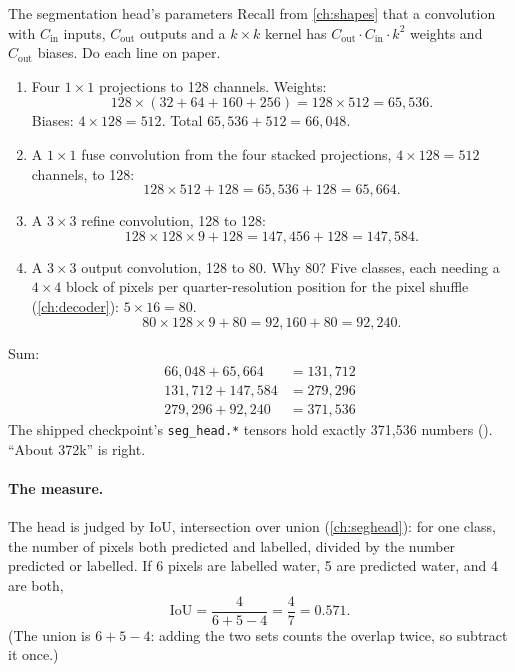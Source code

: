\begin{worked}[label={we:ftruns:seghead}]{The segmentation head's parameters}
Recall from \cref{ch:shapes} that a convolution with $C_\text{in}$ inputs, $C_\text{out}$ outputs and a $k
\times k$ kernel has $C_\text{out} \cdot C_\text{in} \cdot k^2$ weights and $C_\text{out}$ biases. Do each line
on paper.
\begin{enumerate}
\item Four $1 \times 1$ projections to 128 channels. Weights:
  \[
  128 \times (32 + 64 + 160 + 256) = 128 \times 512 = 65{,}536 .
  \]
  Biases: $4 \times 128 = 512$. Total $65{,}536 + 512 = 66{,}048$.
\item A $1 \times 1$ fuse convolution from the four stacked projections, $4 \times 128 = 512$ channels, to 128:
  \[
  128 \times 512 + 128 = 65{,}536 + 128 = 65{,}664 .
  \]
\item A $3 \times 3$ refine convolution, 128 to 128:
  \[
  128 \times 128 \times 9 + 128 = 147{,}456 + 128 = 147{,}584 .
  \]
\item A $3 \times 3$ output convolution, 128 to 80. Why 80? Five classes, each needing a $4 \times 4$ block of
  pixels per quarter-resolution position for the pixel shuffle (\cref{ch:decoder}): $5 \times 16 = 80$.
  \[
  80 \times 128 \times 9 + 80 = 92{,}160 + 80 = 92{,}240 .
  \]
\end{enumerate}
Sum:
\begin{align*}
66{,}048 + 65{,}664 &= 131{,}712\\
131{,}712 + 147{,}584 &= 279{,}296\\
279{,}296 + 92{,}240 &= 371{,}536
\end{align*}
The shipped checkpoint's \texttt{seg\_head.*} tensors hold exactly 371,536 numbers
()\tagC. ``About 372k'' is right.
\end{worked}

\paragraph{The measure.}  The head is judged by IoU, intersection over union
(\cref{ch:seghead}): for one class, the number of pixels both predicted and labelled, divided by the number
predicted or labelled. If 6 pixels are labelled water, 5 are predicted water, and 4 are both,
\[
\text{IoU} = \frac{4}{6 + 5 - 4} = \frac{4}{7} = 0.571 .
\]
(The union is $6 + 5 - 4$: adding the two sets counts the overlap twice, so subtract it once.)

